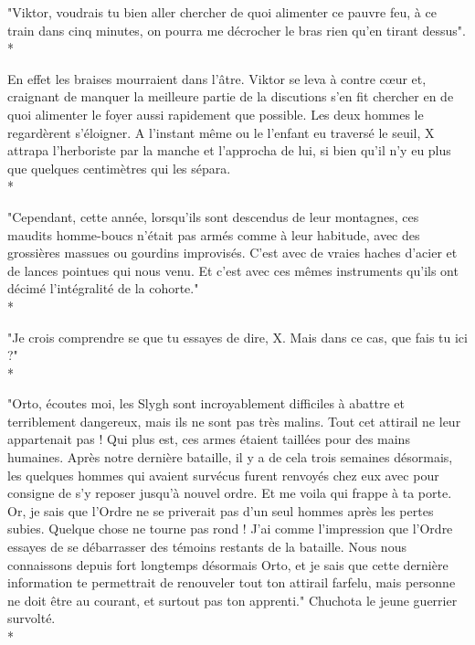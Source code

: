 \documentclass{book}
\begin{document}
"Viktor, voudrais tu bien aller chercher de quoi alimenter ce pauvre feu, à ce train dans cinq minutes, on pourra me décrocher le bras rien qu'en tirant dessus".\\*

En effet les braises mourraient dans l'âtre. Viktor se leva à contre cœur et, craignant de manquer la meilleure partie de la discutions s'en fit chercher en de quoi alimenter le foyer aussi rapidement que possible. Les deux hommes le regardèrent s'éloigner. A l'instant même ou le l'enfant eu traversé le seuil, X attrapa l'herboriste par la manche et l'approcha de lui, si bien qu'il n'y eu plus que quelques centimètres qui les sépara.\\*

"Cependant, cette année, lorsqu'ils sont descendus de leur montagnes, ces maudits homme-boucs n'était pas armés comme à leur habitude, avec des grossières massues ou gourdins improvisés.
C'est avec de vraies haches d'acier et de lances pointues qui nous venu. Et c'est avec ces mêmes instruments qu'ils ont décimé l’intégralité de la cohorte." \\*

"Je crois comprendre se que tu essayes de dire, X. Mais dans ce cas, que fais tu ici ?"\\*

"Orto, écoutes moi, les Slygh sont incroyablement difficiles à abattre et terriblement dangereux, mais ils ne sont pas très malins. Tout cet attirail ne leur appartenait pas ! Qui plus est, ces armes étaient taillées pour des mains humaines. Après notre dernière bataille, il y a de cela trois semaines désormais, les quelques hommes qui avaient survécus furent renvoyés chez eux avec pour consigne de s'y reposer jusqu’à nouvel ordre. Et me voila qui frappe à ta porte. Or, je sais que l'Ordre ne se priverait pas d'un seul hommes après les pertes subies. Quelque chose ne tourne pas rond ! J'ai comme l'impression que l'Ordre essayes de se débarrasser des témoins restants de la bataille. Nous nous connaissons depuis fort longtemps désormais Orto, et je sais que cette dernière information te permettrait de renouveler tout ton attirail farfelu, mais personne ne doit être au courant, et surtout pas ton apprenti." Chuchota le jeune guerrier survolté.\\*
\end{document}
